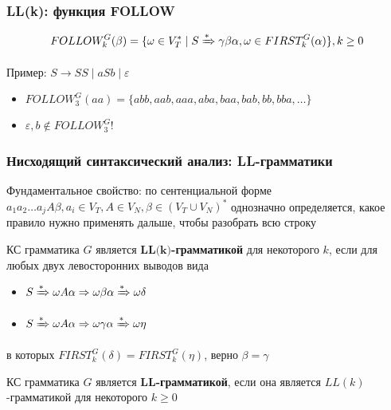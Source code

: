 \documentclass{beamer}
\newcommand{\derive}[0]{\xRightarrow[]{*}}
\begin{document}
\begin{frame}[fragile]
  \transwipe[direction=90]
  \frametitle{LL(k): функция FOLLOW}
  \[FOLLOW^G_k(\beta) = \{ \omega \in V_T^* \mid S \derive \gamma \beta \alpha, \omega \in FIRST^G_k(\alpha) \}, k \geq 0\]

  \vfill

   Пример: $S \to S S \mid a S b \mid \varepsilon$

   \begin{itemize}
     \item  $FOLLOW^G_3( a a ) = \{ a b b, a a b, a a a, a b a, b a a, b a b, b b, b b a, \dots \}$
     \item $\varepsilon, b \notin FOLLOW^G_3$!
   \end{itemize}
\end{frame}


\begin{frame}[fragile]
  \transwipe[direction=90]
  \frametitle{Нисходящий синтаксический анализ: LL-грамматики}
    Фундаментальное свойство: по сентенциальной форме $a_1 a_2 \dots a_j A \beta, a_i \in V_T, A \in V_N, \beta \in (V_T \cup V_N)^*$ однозначно определяется, какое правило нужно применять дальше, чтобы разобрать всю строку \pause

    \vfill

   КС грамматика $G$ является $\textbf{LL(k)}$\textbf{-грамматикой} для некоторого $k$,  если для любых двух левосторонних выводов вида
  \begin{itemize}
    \item $S \derive \omega A \alpha \Rightarrow \omega \beta \alpha \derive \omega \delta$
    \item $S \derive \omega A \alpha \Rightarrow \omega \gamma \alpha \derive \omega \eta$
  \end{itemize}
  в которых $FIRST^G_k(\delta) = FIRST ^G_k(\eta)$, верно $\beta = \gamma$

\vfill

  КС грамматика $G$ является $\textbf{LL}$\textbf{-грамматикой}, если она является $LL(k)$-грамматикой для некоторого $k \geq 0$
\end{frame}
\end{document}
